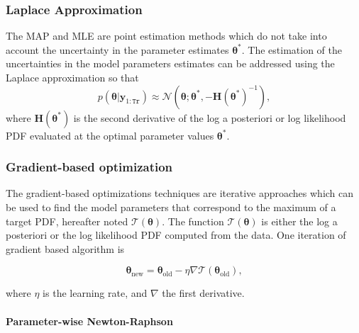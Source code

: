 \subsubsection{Laplace Approximation}

The MAP and MLE are point estimation methods which do not take into account the uncertainty in the parameter estimates $\bm\theta^{*}$. 
The estimation of the uncertainties in the model parameters estimates can be addressed using the Laplace approximation \cite{gelman2014bayesian} so that
$$p(\bm\theta|\mathbf{y}_{1:\mathtt{Tr}})  \approx  \mathcal{N}\left(\bm\theta;\bm\theta^{*},-\mathbf{H}(\bm\theta^{*})^{-1}\right),
\label{EQ: LaA}
$$
where $\mathbf{H}(\bm\theta^{*})$ is the second derivative of the log a posteriori or log likelihood PDF evaluated at the optimal parameter values $\bm\theta^{*}$. 

\subsubsection{Gradient-based optimization}

The gradient-based optimizations techniques are iterative approaches which can be used to find the model parameters that correspond to the maximum of a target PDF, hereafter noted $\mathcal{T}(\bm{\theta})$.
The function $\mathcal{T}(\bm{\theta})$  is either the log a posteriori or the log likelihood PDF computed from the data.
One iteration of gradient based algorithm is

\begin{equation}
{\bm\theta}_{\text{new}}  = {\bm\theta}_{\text{old}} - \eta \nabla \mathcal{T}(\bm{\theta}_{\text{old}}),
\label{EQ:GBA}
\end{equation}

where $\eta$ is the learning rate, and $\nabla$ the first derivative.

\paragraph{Parameter-wise Newton-Raphson}

